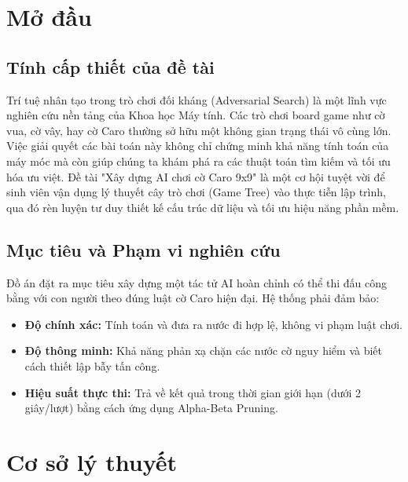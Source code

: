 \documentclass[13pt,a4paper]{article}
\begin{document}
\mbox{}
\newpage

\newpage
\tableofcontents
\newpage


\section{Mở đầu}

\subsection{Tính cấp thiết của đề tài}
Trí tuệ nhân tạo trong trò chơi đối kháng (Adversarial Search) là một lĩnh vực nghiên cứu nền tảng của Khoa học Máy tính. Các trò chơi board game như cờ vua, cờ vây, hay cờ Caro thường sở hữu một không gian trạng thái vô cùng lớn. Việc giải quyết các bài toán này không chỉ chứng minh khả năng tính toán của máy móc mà còn giúp chúng ta khám phá ra các thuật toán tìm kiếm và tối ưu hóa ưu việt. Đề tài "Xây dựng AI chơi cờ Caro 9x9" là một cơ hội tuyệt vời để sinh viên vận dụng lý thuyết cây trò chơi (Game Tree) vào thực tiễn lập trình, qua đó rèn luyện tư duy thiết kế cấu trúc dữ liệu và tối ưu hiệu năng phần mềm.

\subsection{Mục tiêu và Phạm vi nghiên cứu}
Đồ án đặt ra mục tiêu xây dựng một tác tử AI hoàn chỉnh có thể thi đấu công bằng với con người theo đúng luật cờ Caro hiện đại. Hệ thống phải đảm bảo:
\begin{itemize}
    \item \textbf{Độ chính xác:} Tính toán và đưa ra nước đi hợp lệ, không vi phạm luật chơi.
    \item \textbf{Độ thông minh:} Khả năng phản xạ chặn các nước cờ nguy hiểm và biết cách thiết lập bẫy tấn công.
    \item \textbf{Hiệu suất thực thi:} Trả về kết quả trong thời gian giới hạn (dưới 2 giây/lượt) bằng cách ứng dụng Alpha-Beta Pruning.
\end{itemize}

\section{Cơ sở lý thuyết}
\end{document}
